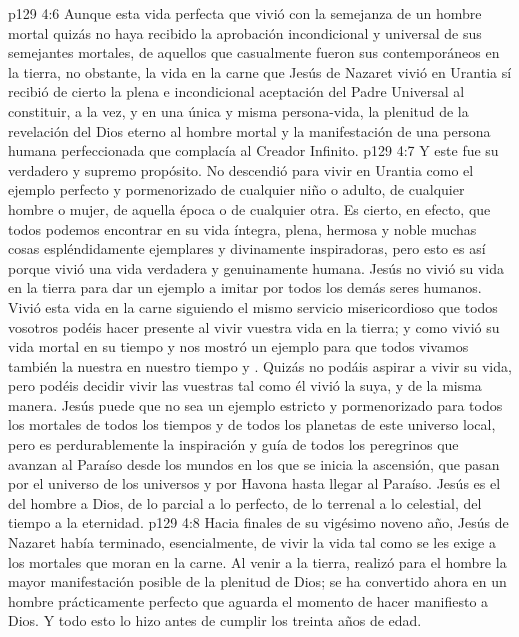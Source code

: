 \vs p129 4:6 Aunque esta vida perfecta que vivió con la semejanza de un hombre mortal quizás no haya recibido la aprobación incondicional y universal de sus semejantes mortales, de aquellos que casualmente fueron sus contemporáneos en la tierra, no obstante, la vida en la carne que Jesús de Nazaret vivió en Urantia sí recibió de cierto la plena e incondicional aceptación del Padre Universal al constituir, a la vez, y en una única y misma persona\hyp{}vida, la plenitud de la revelación del Dios eterno al hombre mortal y la manifestación de una persona humana perfeccionada que complacía al Creador Infinito.
\vs p129 4:7 Y este fue su verdadero y supremo propósito. No descendió para vivir en Urantia como el ejemplo perfecto y pormenorizado de cualquier niño o adulto, de cualquier hombre o mujer, de aquella época o de cualquier otra. Es cierto, en efecto, que todos podemos encontrar en su vida íntegra, plena, hermosa y noble muchas cosas espléndidamente ejemplares y divinamente inspiradoras, pero esto es así porque vivió una vida verdadera y genuinamente humana. Jesús no vivió su vida en la tierra para dar un ejemplo a imitar por todos los demás seres humanos. Vivió esta vida en la carne siguiendo el mismo servicio misericordioso que todos vosotros podéis hacer presente al vivir vuestra vida en la tierra; y como vivió su vida mortal en su tiempo y  nos mostró un ejemplo para que todos vivamos también la nuestra en nuestro tiempo y . Quizás no podáis aspirar a vivir su vida, pero podéis decidir vivir las vuestras tal como él vivió la suya, y de la misma manera. Jesús puede que no sea un ejemplo estricto y pormenorizado para todos los mortales de todos los tiempos y de todos los planetas de este universo local, pero es perdurablemente la inspiración y guía de todos los peregrinos que avanzan al Paraíso desde los mundos en los que se inicia la ascensión, que pasan por el universo de los universos y por Havona hasta llegar al Paraíso. Jesús es el  del hombre a Dios, de lo parcial a lo perfecto, de lo terrenal a lo celestial, del tiempo a la eternidad.
\vs p129 4:8 \pc Hacia finales de su vigésimo noveno año, Jesús de Nazaret había terminado, esencialmente, de vivir la vida tal como se les exige a los mortales que moran en la carne. Al venir a la tierra, realizó para el hombre la mayor manifestación posible de la plenitud de Dios; se ha convertido ahora en un hombre prácticamente perfecto que aguarda el momento de hacer manifiesto a Dios. Y todo esto lo hizo antes de cumplir los treinta años de edad.
